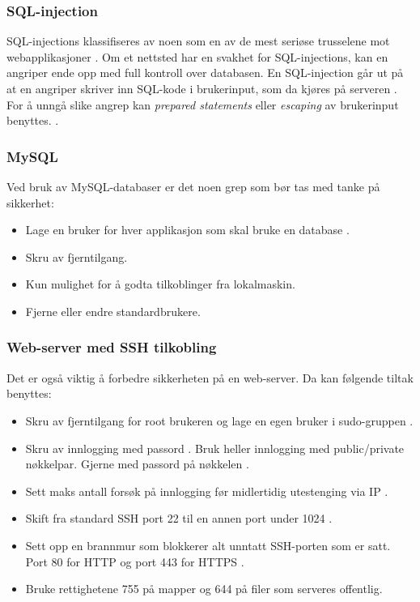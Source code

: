 \subsubsection{SQL-injection}
\label{sec:analysis-security-sql-injection}
SQL-injections klassifiseres av noen som en av de mest seriøse trusselene mot webapplikasjoner \cite[s.~1]{halfond2006classification}. Om et nettsted har en svakhet for SQL-injections, kan en angriper ende opp med full kontroll over databasen.
En SQL-injection går ut på at en angriper skriver inn SQL-kode i brukerinput, som da kjøres på serveren \cite[s.~2]{halfond2006classification}.
For å unngå slike angrep kan \textit{prepared statements} eller \textit{escaping} av brukerinput benyttes. \cite[s.~6]{halfond2006classification}.

\subsubsection{MySQL}
\label{sec:analysis-security-mysql}
Ved bruk av MySQL-databaser er det noen grep som bør tas med tanke 
på sikkerhet:
\begin{itemize}
\item Lage en bruker for hver applikasjon som skal bruke en database \cite{ellingwood_2013}.
\item Skru av fjerntilgang.
\item Kun mulighet for å godta tilkoblinger fra lokalmaskin.
\item Fjerne eller endre standardbrukere.
\end{itemize}

\subsubsection{Web-server med SSH tilkobling}
\label{sec:analysis-security-web-server-ssh}
Det er også viktig å forbedre sikkerheten på en web-server. Da kan følgende tiltak benyttes:
\begin{itemize}
\item Skru av fjerntilgang for root brukeren og lage en egen bruker i sudo-gruppen \cite{ellingwood_2014}.
\item Skru av innlogging med passord \cite{jetha2018}. Bruk heller innlogging med public/private nøkkelpar. Gjerne med passord på nøkkelen \cite{jetha2018}.
\item Sett maks antall forsøk på innlogging før midlertidig utestenging via IP \cite{ellingwood_2014_2}.
\item Skift fra standard SSH port 22 \cite{miessler2019} til en annen port under 1024 \cite{w3cports1995}.
\item Sett opp en brannmur som blokkerer alt unntatt SSH-porten som er satt. Port 80 for HTTP og port 443 for HTTPS \cite{virdo2016}.
\item Bruke rettighetene 755 på mapper og 644 på filer som serveres offentlig. \cite[s.~34]{barnettapache}
\end{itemize}

